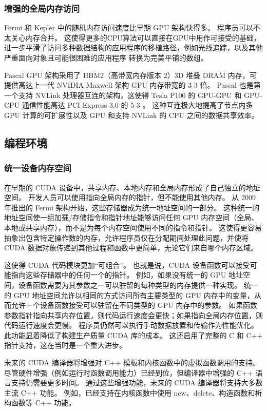 \subsubsection{增强的全局内存访问}
Fermi 和 Kepler 中的随机内存访问速度比早期 GPU 架构快得多。 程序员可以不太关心内存合并。 这使得更多的CPU算法可以直接在GPU中用作可接受的基础，进一步平滑了访问多种数据结构的应用程序的移植路径，例如光线追踪，以及其他严重面向对象且可能很困难的应用程序 转换为完美平铺的数组。

Pascal GPU 架构采用了 HBM2（高带宽内存版本 2）3D 堆叠 DRAM 内存，可提供高达上一代 NVIDIA Maxwell 架构 GPU 内存带宽的 3 3 倍。 Pascal 也是第一个支持 NVLink 处理器互连的架构，这使得 Tesla P100 的 GPU-GPU 和 GPU-CPU 通信性能高达 PCI Express 3.0 的 5 3 。 这种互连极大地提高了节点内多 GPU 计算的可扩展性以及 GPU 和支持 NVLink 的 CPU 之间的数据共享效率。

\subsection{编程环境}
\subsubsection{统一设备内存空间}
在早期的 CUDA 设备中，共享内存、本地内存和全局内存形成了自己独立的地址空间。 开发人员可以使用指向全局内存的指针，但不能使用其他内存。 从 2009 年推出的 Fermi 架构开始，这些存储器成为统一地址空间的一部分。 这种统一的地址空间使一组加载/存储指令和指针地址能够访问任何 GPU 内存空间（全局、本地或共享内存），而不是为每个内存空间使用不同的指令和指针。 这使得更容易抽象出包含特定操作数的内存，允许程序员仅在分配期间处理此问题，并使将 CUDA 数据对象传递到其他过程和函数中更简单，无论它们来自哪个内存区域。

这使得 CUDA 代码模块更加“可组合”。 也就是说，CUDA 设备函数可以接受可能指向这些存储器中的任何一个的指针。 例如，如果没有统一的 GPU 地址空间，设备函数需要为其参数之一可以驻留的每种类型的内存提供一种实现。 统一的 GPU 地址空间允许以相同的方式访问所有主要类型的 GPU 内存中的变量，从而允许一个设备函数接受可以驻留在不同类型的 GPU 内存中的参数。 如果函数参数指针指向共享内存位置，则代码运行速度会更快；如果指向全局内存位置，则代码运行速度会更慢。 程序员仍然可以执行手动数据放置和传输作为性能优化。 此功能显着降低了构建生产质量 CUDA 库的成本。 这还启用了完整的 C 和 C++ 指针支持，这在当时是一个重大进步。

未来的 CUDA 编译器将增强对 C++ 模板和内核函数中的虚拟函数调用的支持。 尽管硬件增强（例如运行时函数调用能力）已经到位，但编译器中增强的 C++ 语言支持仍需要更多时间。 通过这些增强功能，未来的 CUDA 编译器将支持大多数主流 C++ 功能。 例如，已经支持在内核函数中使用 new、delete、构造函数和析构函数等 C++ 功能。


